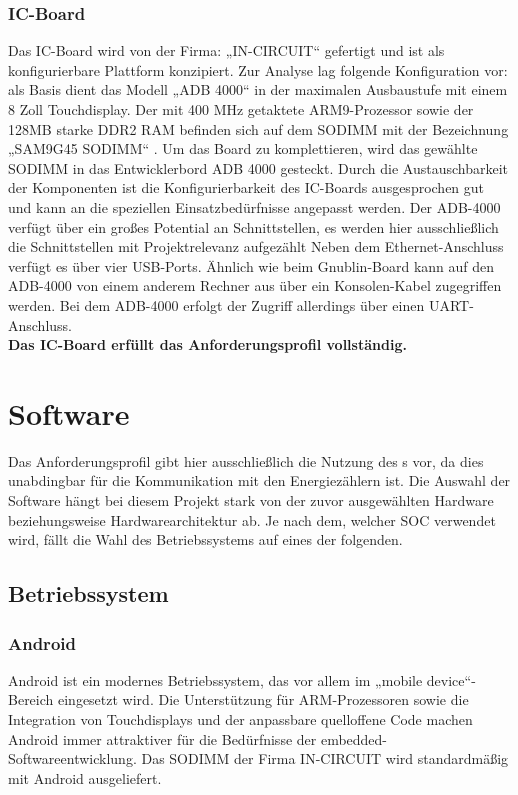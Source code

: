 \documentclass[../Bachelorarbeit.tex]{subfiles}
\begin{document}
\subsubsection*{IC-Board}
\label{para:ic-board} 
Das IC-Board wird von der Firma: „IN-CIRCUIT“ gefertigt und ist als konfigurierbare Plattform konzipiert. Zur Analyse lag folgende Konfiguration vor: als Basis dient das Modell „ADB 4000“
\parencite[vgl.][]{ic_adb_4000_interface} 
in der maximalen Ausbaustufe mit einem 8 Zoll Touchdisplay. Der mit 400 MHz getaktete \acs{ARM}9-Prozessor sowie der 128MB starke DDR2 RAM befinden sich auf dem \acf{SODIMM} mit der Bezeichnung „SAM9G45 SODIMM“ 
\parencite[vgl.][]{ic_SAM9G45_sodimm}.
Um das Board zu 
komplettieren, wird das gewählte \ac{SODIMM} in das Entwicklerbord ADB 4000 
gesteckt. Durch die Austauschbarkeit der Komponenten ist die Konfigurierbarkeit des IC-Boards ausgesprochen gut und kann an die speziellen Einsatzbedürfnisse angepasst 
werden. Der ADB-4000 verfügt über ein großes Potential an Schnittstellen, es werden hier 
ausschließlich die Schnittstellen mit Projektrelevanz aufgezählt Neben dem Ethernet-Anschluss verfügt es über vier USB-Ports.
Ähnlich wie beim Gnublin-Board kann auf den ADB-4000 von einem anderem Rechner aus über ein Konsolen-Kabel zugegriffen werden.
Bei dem ADB-4000 erfolgt der Zugriff allerdings über einen \ac{UART}-Anschluss.\\
\textbf{Das IC-Board erfüllt das Anforderungsprofil vollständig.}

\section{Software}
Das Anforderungsprofil gibt hier ausschließlich die Nutzung des s vor, da
dies unabdingbar für die Kommunikation mit den Energiezählern ist. Die Auswahl der 
Software hängt bei diesem Projekt stark von der zuvor ausgewählten Hardware 
beziehungsweise Hardwarearchitektur ab. Je nach dem, welcher \ac{SOC} verwendet wird, 
fällt die Wahl des Betriebssystems auf eines der folgenden.

\subsection{Betriebssystem}

\subsubsection*{Android}
Android ist ein modernes Betriebssystem, das vor allem im „mobile device“-Bereich 
eingesetzt wird. 
Die Unterstützung für \ac{ARM}-Prozessoren sowie die Integration von Touchdisplays und der anpassbare quelloffene Code machen Android immer attraktiver für die Bedürfnisse der  embedded-Softwareentwicklung. Das \ac{SODIMM} der Firma IN-CIRCUIT wird standardmäßig mit Android ausgeliefert. 
\end{document}

